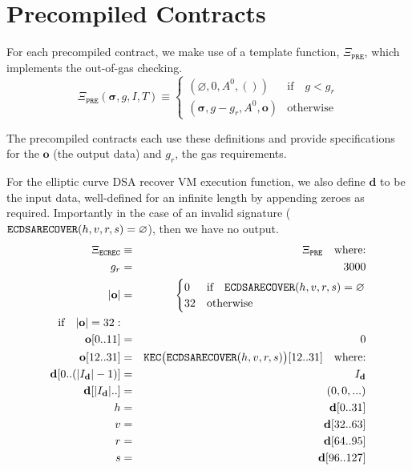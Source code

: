 \documentclass[9pt,oneside]{amsart}
\begin{document}
\section{Precompiled Contracts}\label{app:precompiled}

For each precompiled contract, we make use of a template function, $\Xi_{\mathtt{PRE}}$, which implements the out-of-gas checking.
\begin{equation} \label{eq:pre}
\Xi_{\mathtt{PRE}}(\boldsymbol{\sigma}, g, I, T) \equiv \begin{cases}
(\varnothing, 0, A^0, ()) & \text{if} \quad g < g_r \\
(\boldsymbol\sigma, g - g_r, A^0, \mathbf{o}) & \text{otherwise}\end{cases}
\end{equation}

The precompiled contracts each use these definitions and provide specifications for the $\mathbf{o}$ (the output data) and $g_r$, the gas requirements.

For the elliptic curve DSA recover VM execution function, we also define $\mathbf{d}$ to be the input data, well-defined for an infinite length by appending zeroes as required. Importantly in the case of an invalid signature ($\mathtt{\tiny ECDSARECOVER}(h, v, r, s) = \varnothing$), then we have no output.
\begin{eqnarray}
\Xi_{\mathtt{ECREC}} &\equiv& \Xi_{\mathtt{PRE}} \quad \text{where:} \\
g_r &=& 3000\\
|\mathbf{o}| &=& \begin{cases} 0 & \text{if} \quad \mathtt{\tiny ECDSARECOVER}(h, v, r, s) = \varnothing\\ 32 & \text{otherwise} \end{cases}\\
\text{if} \quad |\mathbf{o}| = 32: &&\\
\mathbf{o}[0..11] &=& 0 \\
\mathbf{o}[12..31] &=& \mathtt{\tiny KEC}\big(\mathtt{\tiny ECDSARECOVER}(h, v, r, s)\big)[12..31] \quad \text{where:}\\
\mathbf{d}[0..(|I_\mathbf{d}|-1)] &=& I_\mathbf{d}\\
\mathbf{d}[|I_\mathbf{d}|..] &=& (0, 0, ...) \\
h &=& \mathbf{d}[0..31]\\
v &=& \mathbf{d}[32..63]\\
r &=& \mathbf{d}[64..95]\\
s &=& \mathbf{d}[96..127]
\end{eqnarray}
\end{document}
